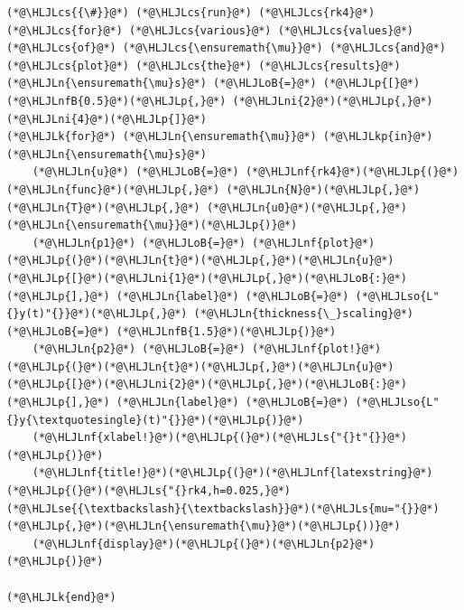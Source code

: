 \documentclass[12pt,a4paper]{article}
\newcommand{\HLJLk}[1]{\textcolor[RGB]{148,91,176}{\textbf{#1}}}
\newcommand{\HLJLkp}[1]{\textcolor[RGB]{148,91,176}{\textbf{#1}}}
\newcommand{\HLJLn}[1]{#1}
\newcommand{\HLJLnf}[1]{\textcolor[RGB]{66,102,213}{#1}}
\newcommand{\HLJLs}[1]{\textcolor[RGB]{201,61,57}{#1}}
\newcommand{\HLJLse}[1]{\textcolor[RGB]{59,151,46}{#1}}
\newcommand{\HLJLso}[1]{\textcolor[RGB]{201,61,57}{#1}}
\newcommand{\HLJLnfB}[1]{\textcolor[RGB]{59,151,46}{#1}}
\newcommand{\HLJLni}[1]{\textcolor[RGB]{59,151,46}{#1}}
\newcommand{\HLJLoB}[1]{\textcolor[RGB]{102,102,102}{\textbf{#1}}}
\newcommand{\HLJLp}[1]{#1}
\newcommand{\HLJLcs}[1]{\textcolor[RGB]{153,153,119}{\textit{#1}}}
\begin{document}
\begin{lstlisting}
(*@\HLJLcs{{\#}}@*) (*@\HLJLcs{run}@*) (*@\HLJLcs{rk4}@*) (*@\HLJLcs{for}@*) (*@\HLJLcs{various}@*) (*@\HLJLcs{values}@*) (*@\HLJLcs{of}@*) (*@\HLJLcs{\ensuremath{\mu}}@*) (*@\HLJLcs{and}@*) (*@\HLJLcs{plot}@*) (*@\HLJLcs{the}@*) (*@\HLJLcs{results}@*)
(*@\HLJLn{\ensuremath{\mu}s}@*) (*@\HLJLoB{=}@*) (*@\HLJLp{[}@*)(*@\HLJLnfB{0.5}@*)(*@\HLJLp{,}@*) (*@\HLJLni{2}@*)(*@\HLJLp{,}@*) (*@\HLJLni{4}@*)(*@\HLJLp{]}@*)
(*@\HLJLk{for}@*) (*@\HLJLn{\ensuremath{\mu}}@*) (*@\HLJLkp{in}@*) (*@\HLJLn{\ensuremath{\mu}s}@*)
    (*@\HLJLn{u}@*) (*@\HLJLoB{=}@*) (*@\HLJLnf{rk4}@*)(*@\HLJLp{(}@*)(*@\HLJLn{func}@*)(*@\HLJLp{,}@*) (*@\HLJLn{N}@*)(*@\HLJLp{,}@*) (*@\HLJLn{T}@*)(*@\HLJLp{,}@*) (*@\HLJLn{u0}@*)(*@\HLJLp{,}@*) (*@\HLJLn{\ensuremath{\mu}}@*)(*@\HLJLp{)}@*)
    (*@\HLJLn{p1}@*) (*@\HLJLoB{=}@*) (*@\HLJLnf{plot}@*)(*@\HLJLp{(}@*)(*@\HLJLn{t}@*)(*@\HLJLp{,}@*)(*@\HLJLn{u}@*)(*@\HLJLp{[}@*)(*@\HLJLni{1}@*)(*@\HLJLp{,}@*)(*@\HLJLoB{:}@*)(*@\HLJLp{],}@*) (*@\HLJLn{label}@*) (*@\HLJLoB{=}@*) (*@\HLJLso{L"{}y(t)"{}}@*)(*@\HLJLp{,}@*) (*@\HLJLn{thickness{\_}scaling}@*) (*@\HLJLoB{=}@*) (*@\HLJLnfB{1.5}@*)(*@\HLJLp{)}@*)
    (*@\HLJLn{p2}@*) (*@\HLJLoB{=}@*) (*@\HLJLnf{plot!}@*)(*@\HLJLp{(}@*)(*@\HLJLn{t}@*)(*@\HLJLp{,}@*)(*@\HLJLn{u}@*)(*@\HLJLp{[}@*)(*@\HLJLni{2}@*)(*@\HLJLp{,}@*)(*@\HLJLoB{:}@*)(*@\HLJLp{],}@*) (*@\HLJLn{label}@*) (*@\HLJLoB{=}@*) (*@\HLJLso{L"{}y{\textquotesingle}(t)"{}}@*)(*@\HLJLp{)}@*)
    (*@\HLJLnf{xlabel!}@*)(*@\HLJLp{(}@*)(*@\HLJLs{"{}t"{}}@*)(*@\HLJLp{)}@*)
    (*@\HLJLnf{title!}@*)(*@\HLJLp{(}@*)(*@\HLJLnf{latexstring}@*)(*@\HLJLp{(}@*)(*@\HLJLs{"{}rk4,h=0.025,}@*)(*@\HLJLse{{\textbackslash}{\textbackslash}}@*)(*@\HLJLs{mu="{}}@*)(*@\HLJLp{,}@*)(*@\HLJLn{\ensuremath{\mu}}@*)(*@\HLJLp{))}@*)
    (*@\HLJLnf{display}@*)(*@\HLJLp{(}@*)(*@\HLJLn{p2}@*)(*@\HLJLp{)}@*)

(*@\HLJLk{end}@*)
\end{lstlisting}
\end{document}
